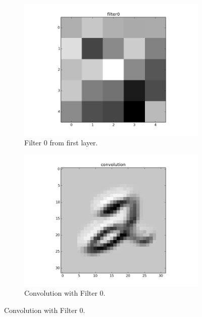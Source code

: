 \documentclass{article}
\begin{document}
\begin{figure}[h]
	\centering
	\begin{subfigure}[b]{0.45\textwidth} 
		\includegraphics[width=\textwidth]{graphics/filt0.png}
		\caption{Filter 0 from first layer.}
		\label{fig4}
	\end{subfigure}
	\begin{subfigure}[b]{0.45\textwidth} 
		\includegraphics[width=\textwidth]{graphics/conv0.png}
		\caption{Convolution with Filter 0.}
		\label{fig5}
	\end{subfigure}
\end{figure}
\end{document}
